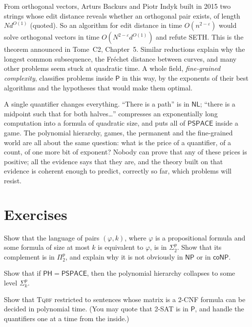 From orthogonal vectors, Arturs Backurs and Piotr Indyk built in 2015 two strings whose edit distance reveals whether an orthogonal pair exists, of length $N d^{O(1)}$ (quoted). So an algorithm for edit distance in time $O(n^{2-\varepsilon})$ would solve orthogonal vectors in time $O(N^{2-\varepsilon}d^{O(1)})$ and refute SETH. This is the theorem announced in Tome~C2, Chapter~5. Similar reductions explain why the longest common subsequence, the Fréchet distance between curves, and many other problems seem stuck at quadratic time. A whole field, \emph{fine-grained complexity}, classifies problems inside $\mathsf P$ in this way, by the exponents of their best algorithms and the hypotheses that would make them optimal.

\begin{beauty}
A single quantifier changes everything. ``There is a path'' is in $\mathsf{NL}$; ``there is a midpoint such that for both halves\dots'' compresses an exponentially long computation into a formula of quadratic size, and puts all of $\mathsf{PSPACE}$ inside a game. The polynomial hierarchy, games, the permanent and the fine-grained world are all about the same question: what is the price of a quantifier, of a count, of one more bit of exponent? Nobody can prove that any of these prices is positive; all the evidence says that they are, and the theory built on that evidence is coherent enough to predict, correctly so far, which problems will resist.
\end{beauty}

\section{Exercises}

\begin{exercise}[$\star$]\label{ex:minformula}
Show that the language of pairs $(\varphi,k)$, where $\varphi$ is a propositional formula and some formula of size at most $k$ is equivalent to $\varphi$, is in $\Sigma_2^p$. Show that its complement is in $\Pi_2^p$, and explain why it is not obviously in $\mathsf{NP}$ or in $\mathsf{coNP}$.
\end{exercise}

\begin{exercise}[$\star$]\label{ex:phpspace}
Show that if $\mathsf{PH}=\mathsf{PSPACE}$, then the polynomial hierarchy collapses to some level $\Sigma_k^p$.
\end{exercise}

\begin{exercise}[$\star$]\label{ex:qbf2cnf}
Show that \textup{\textsc{Tqbf}} restricted to sentences whose matrix is a 2-CNF formula can be decided in polynomial time. (You may quote that 2-SAT is in $\mathsf P$, and handle the quantifiers one at a time from the inside.)
\end{exercise}

